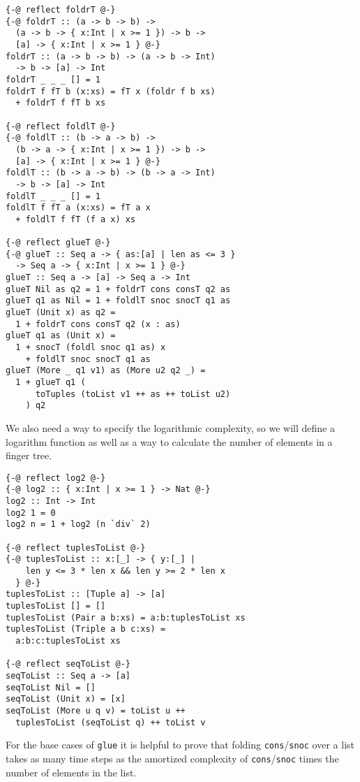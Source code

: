 \documentclass[sigplan,screen,review,anonymous]{acmart}
\begin{document}
\begin{lstlisting}
{-@ reflect foldrT @-}
{-@ foldrT :: (a -> b -> b) ->
  (a -> b -> { x:Int | x >= 1 }) -> b ->
  [a] -> { x:Int | x >= 1 } @-}
foldrT :: (a -> b -> b) -> (a -> b -> Int)
  -> b -> [a] -> Int
foldrT _ _ _ [] = 1
foldrT f fT b (x:xs) = fT x (foldr f b xs)
  + foldrT f fT b xs

{-@ reflect foldlT @-}
{-@ foldlT :: (b -> a -> b) ->
  (b -> a -> { x:Int | x >= 1 }) -> b ->
  [a] -> { x:Int | x >= 1 } @-}
foldlT :: (b -> a -> b) -> (b -> a -> Int)
  -> b -> [a] -> Int
foldlT _ _ _ [] = 1
foldlT f fT a (x:xs) = fT a x
  + foldlT f fT (f a x) xs

{-@ reflect glueT @-}
{-@ glueT :: Seq a -> { as:[a] | len as <= 3 }
  -> Seq a -> { x:Int | x >= 1 } @-}
glueT :: Seq a -> [a] -> Seq a -> Int
glueT Nil as q2 = 1 + foldrT cons consT q2 as
glueT q1 as Nil = 1 + foldlT snoc snocT q1 as
glueT (Unit x) as q2 =
  1 + foldrT cons consT q2 (x : as)
glueT q1 as (Unit x) =
  1 + snocT (foldl snoc q1 as) x
    + foldlT snoc snocT q1 as
glueT (More _ q1 v1) as (More u2 q2 _) =
  1 + glueT q1 (
      toTuples (toList v1 ++ as ++ toList u2)
    ) q2
\end{lstlisting}

We also need a way to specify the logarithmic complexity, so we will define a logarithm function as well as a way to calculate the number of elements in a finger tree.

\begin{lstlisting}
{-@ reflect log2 @-}
{-@ log2 :: { x:Int | x >= 1 } -> Nat @-}
log2 :: Int -> Int
log2 1 = 0
log2 n = 1 + log2 (n `div` 2)

{-@ reflect tuplesToList @-}
{-@ tuplesToList :: x:[_] -> { y:[_] |
    len y <= 3 * len x && len y >= 2 * len x
  } @-}
tuplesToList :: [Tuple a] -> [a]
tuplesToList [] = []
tuplesToList (Pair a b:xs) = a:b:tuplesToList xs
tuplesToList (Triple a b c:xs) =
  a:b:c:tuplesToList xs

{-@ reflect seqToList @-}
seqToList :: Seq a -> [a]
seqToList Nil = []
seqToList (Unit x) = [x]
seqToList (More u q v) = toList u ++
  tuplesToList (seqToList q) ++ toList v
\end{lstlisting}

For the base cases of \texttt{glue} it is helpful to prove that folding \texttt{cons}/\texttt{snoc} over a list takes as many time steps as the amortized complexity of \texttt{cons}/\texttt{snoc} times the number of elements in the list.
\end{document}
